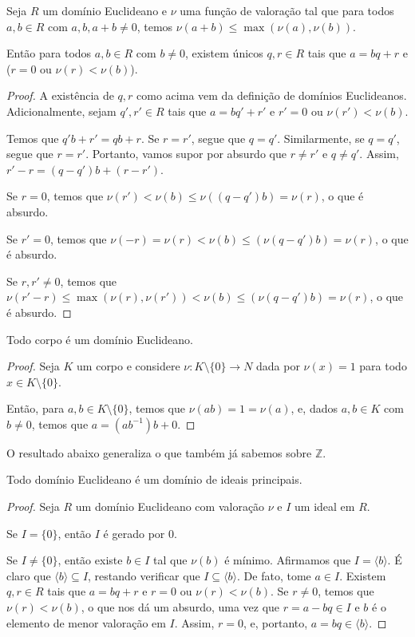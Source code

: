 \begin{prop}
    Seja $R$ um domínio Euclideano e $\nu$ uma função de valoração tal que
    para todos $a, b\in R$ com $a, b, a+b\neq 0$, temos $\nu(a+b)\leq \max(\nu(a), \nu(b))$.
    
    Então para todos $a, b \in R$ com $b\neq 0$, existem únicos $q, r \in R$ tais que $a=bq+r$ e ($r=0$ ou $\nu(r)<\nu(b)$).
\end{prop}
\begin{proof}
    A existência de $q, r$ como acima vem da definição de domínios Euclideanos.
    Adicionalmente, sejam $q', r' \in R$ tais que $a=bq'+r'$ e $r'=0$ ou $\nu(r')<\nu(b)$.

    Temos que $q'b+r'=qb+r$.
    Se $r=r'$, segue que $q=q'$.
    Similarmente, se $q=q'$, segue que $r=r'$.
    Portanto, vamos supor por absurdo que $r\neq r'$ e $q\neq q'$.
    Assim, $r'-r=(q-q')b+(r-r')$.
    
    Se $r=0$, temos que $\nu(r')<\nu(b)\leq \nu((q-q')b)=\nu(r)$, o que é absurdo.

    Se $r'=0$, temos que $\nu(-r)=\nu(r)<\nu(b)\leq(\nu(q-q')b)=\nu(r)$, o que é absurdo.
    
    Se $r, r'\neq 0$, temos que $\nu(r'-r)\leq \max(\nu(r), \nu(r'))<\nu(b)\leq(\nu(q-q')b)=\nu(r)$, o que é absurdo.
\end{proof}

\begin{prop}
    Todo corpo é um domínio Euclideano.
\end{prop}
\begin{proof}
Seja $K$ um corpo e considere $\nu:K\setminus \{0\}\to N$ dada por $\nu(x)=1$ para todo $x\in K\setminus \{0\}$.

    Então, para $a, b \in K\setminus \{0\}$, temos que $\nu(ab)=1=\nu(a)$,
    e, dados $a, b\in K$ com $b\neq 0$, temos que $a=(ab^{-1})b+0$.
\end{proof}

O resultado abaixo generaliza o que também já sabemos sobre $\mathbb Z$.
\begin{prop}
Todo domínio Euclideano é um domínio de ideais principais.
\end{prop}
\begin{proof}
    Seja $R$ um domínio Euclideano com valoração $\nu$ e $I$ um ideal em $R$.

    Se $I=\{0\}$, então $I$ é gerado por $0$.

    Se $I\neq \{0\}$, então existe $b\in I$ tal que $\nu(b)$ é mínimo.
    Afirmamos que $I=\langle b\rangle$.
    É claro que $\langle b\rangle\subseteq I$, restando verificar que $I\subseteq \langle b\rangle$.
    De fato, tome $a \in I$.
    Existem $q, r \in R$ tais que $a=bq+r$ e $r=0$ ou $\nu(r)<\nu(b)$.
    Se $r\neq 0$, temos que $\nu(r)<\nu(b)$, o que nos dá um absurdo, uma vez que $r=a-bq\in I$ e $b$ é o elemento de menor valoração em $I$.
    Assim, $r=0$, e, portanto, $a=bq\in \langle b\rangle$.
\end{proof}






